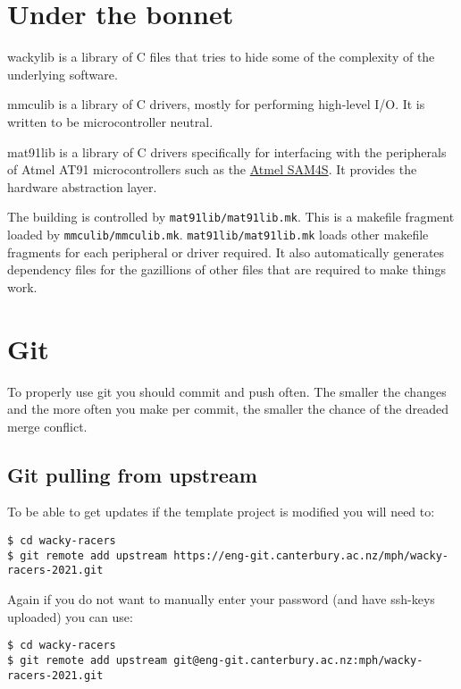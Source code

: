 \section{Under the bonnet}
\label{under-the-bonnet}

wackylib is a library of C files that tries to hide some of the
complexity of the underlying software.

mmculib is a library of C drivers, mostly for performing high-level I/O.
It is written to be microcontroller neutral.

mat91lib is a library of C drivers specifically for interfacing with the
peripherals of Atmel AT91 microcontrollers such as the
\href{Atmel_SAM4S}{Atmel SAM4S}. It provides the hardware abstraction
layer.

The building is controlled by \texttt{mat91lib/mat91lib.mk}. This is a
makefile fragment loaded by \texttt{mmculib/mmculib.mk}.
\texttt{mat91lib/mat91lib.mk} loads other makefile fragments for each
peripheral or driver required. It also automatically generates
dependency files for the gazillions of other files that are required to
make things work.

\section{Git}
\label{git}

To properly use git you should commit and push often. The smaller the
changes and the more often you make per commit, the smaller the chance
of the dreaded merge conflict.

\subsection{Git pulling from upstream}
\label{git-pulling-from-upstream}

To be able to get updates if the template project is modified you will
need to:

\begin{verbatim}
$ cd wacky-racers 
$ git remote add upstream https://eng-git.canterbury.ac.nz/mph/wacky-racers-2021.git  
\end{verbatim}

Again if you do not want to manually enter your password (and have
ssh-keys uploaded) you can use:
%
\begin{verbatim}
$ cd wacky-racers 
$ git remote add upstream git@eng-git.canterbury.ac.nz:mph/wacky-racers-2021.git
\end{verbatim}

